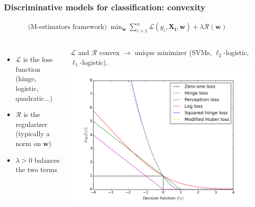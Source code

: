 \begin{frame}
\frametitle{Discriminative models for classification: convexity}
%
%
\begin{align*}
\text{(M-estimators framework)} \; \; \text{min}_{\mathbf{w}} \; \sum_{i=1}^n \mathcal{L}(y_i,\mathbf{X_i},\mathbf{w}) + \lambda \mathcal{R} (\mathbf{w})
\end{align*}
%
\begin{columns}[c]
\begin{itemize}
\item $\mathcal{L}$ is the loss function (hinge, logistic, quadratic...)
\item $\mathcal{R}$ is the regularizer (typically a norm on $\mathbf{w}$)
\item $\lambda > 0$ balances the two terms
\end{itemize}
$\mathcal{L}$ and $\mathcal{R}$ convex $\rightarrow$ unique minimizer (SVMs, $\ell_2$-logistic, $\ell_1$-logistic).
\includegraphics[width=1.2\textwidth]{sklearn_material/plot_sgd_loss_functions_001.png}
\end{columns}
\end{frame}


